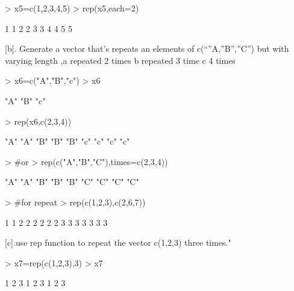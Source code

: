 \documentclass{article}
\begin{document}
\begin{Schunk}
\begin{Sinput}
> x5=c(1,2,3,4,5)
> rep(x5,each=2)
\end{Sinput}
\begin{Soutput}
 [1] 1 1 2 2 3 3 4 4 5 5
\end{Soutput}
\end{Schunk}
[b]. Generate a vector that’s repeats an elements of c(“”A,”B”,”C”) but with varying length ,a repeated 2 times b repeated 3 time c 4 times
\begin{Schunk}
\begin{Sinput}
> x6=c("A","B","c")
> x6
\end{Sinput}
\begin{Soutput}
[1] "A" "B" "c"
\end{Soutput}
\begin{Sinput}
> rep(x6,c(2,3,4))
\end{Sinput}
\begin{Soutput}
[1] "A" "A" "B" "B" "B" "c" "c" "c" "c"
\end{Soutput}
\begin{Sinput}
>             #or
> rep(c("A","B","C"),times=c(2,3,4))
\end{Sinput}
\begin{Soutput}
[1] "A" "A" "B" "B" "B" "C" "C" "C" "C"
\end{Soutput}
\begin{Sinput}
>         #for repeat
> rep(c(1,2,3),c(2,6,7))
\end{Sinput}
\begin{Soutput}
 [1] 1 1 2 2 2 2 2 2 3 3 3 3 3 3 3
\end{Soutput}
\end{Schunk}
[c].use rep function to repeat the vector c(1,2,3) three times."
\begin{Schunk}
\begin{Sinput}
> x7=rep(c(1,2,3),3)
> x7
\end{Sinput}
\begin{Soutput}
[1] 1 2 3 1 2 3 1 2 3
\end{Soutput}
\end{Schunk}
\end{document}
